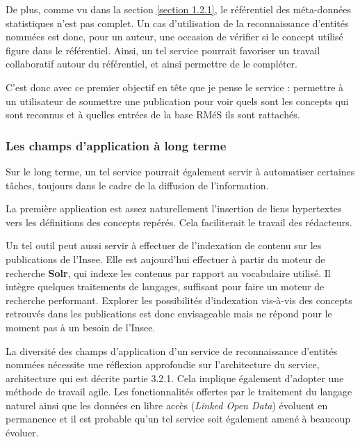 De plus, comme vu dans la section \ref{section 1.2.1}, le référentiel des méta-données statistiques n'est pas complet. Un cas d'utilisation de la reconnaissance d'entités nommées est donc, pour un auteur, une occasion de vérifier si le concept utilisé figure dans le référentiel. Ainsi, un tel service pourrait favoriser un travail collaboratif autour du référentiel, et ainsi permettre de le compléter.
\newline

C'est donc avec ce premier objectif en tête que je pense le service : permettre à un utilisateur de soumettre une publication pour voir quels sont les concepts qui sont reconnus et à quelles entrées de la base RMéS ils sont rattachés.
\label{section 2.1.3}

\subsubsection{Les champs d'application à long terme}
Sur le long terme, un tel service pourrait également servir à automatiser certaines tâches, toujours dans le cadre de la diffusion de l'information. 
\newline

La première application est assez naturellement l'insertion de liens hypertextes vers les définitions des concepts repérés. Cela faciliterait le travail des rédacteurs. 
\newline

Un tel outil peut aussi servir à effectuer de l'indexation de contenu sur les publications de l'Insee. Elle est aujourd'hui effectuer à partir du moteur de recherche \textbf{Solr}, qui indexe les contenus par rapport au vocabulaire utilisé. Il intègre quelques traitements de langages, suffisant pour faire un moteur de recherche performant. Explorer les possibilités d'indexation vis-à-vis des concepts retrouvés dans les publications est donc envisageable mais ne répond pour le moment pas à un besoin de l'Insee.
\newline

La diversité des champs d'application d'un service de reconnaissance d'entités nommées nécessite une réflexion approfondie sur l'architecture du service, architecture qui est décrite partie 3.2.1. Cela implique également d'adopter une méthode de travail agile. Les fonctionnalités offertes par le traitement du langage naturel ainsi que les données en libre accès (\textit{Linked Open Data}) évoluent en permanence et il est probable qu'un tel service soit également amené à beaucoup évoluer.
\label{section 2.1.4}

